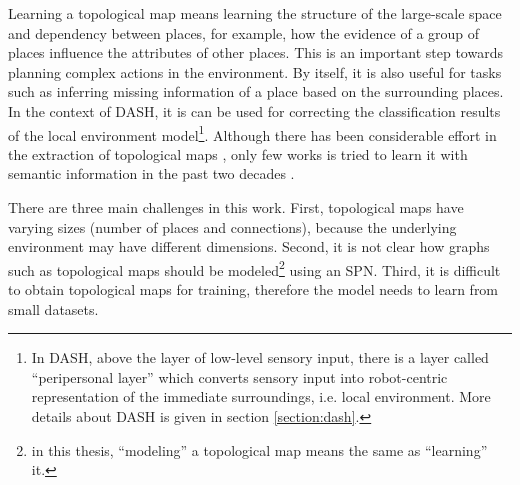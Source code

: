 \documentclass[10pt, titlepage]{article}
\theoremstyle{definition}
\begin{document}
Learning a topological map means learning the structure of the large-scale space and dependency between places, for example, how the evidence of a group of places influence the attributes of other places. This is an important step towards planning complex actions in the environment. By itself, it is also useful for tasks such as inferring missing information of a place based on the surrounding places. In the context of DASH, it is can be used for correcting the classification results of the local environment model\footnote{In DASH, above the layer of low-level sensory input, there is a layer called ``peripersonal layer'' which converts sensory input into robot-centric representation of the immediate surroundings, i.e. local environment. More details about DASH is given in section \ref{section:dash}.}. Although there has been considerable effort in the extraction of topological maps \cite{friedman2007voronoi}\cite{ranganathan2011online}\cite{shi2010online}\cite{tomatis2003hybrid}, only few works is tried to learn it with semantic information in the past two decades \cite{aydemir2012can}\cite{friedman2007voronoi}\cite{mozos2006supervised}.


There are three main challenges in this work. First, topological maps have varying sizes (number of places and connections), because the underlying environment may have different dimensions. Second, it is not clear how graphs such as topological maps should be modeled\footnote{in this thesis, ``modeling'' a topological map means the same as ``learning'' it.} using an SPN. Third, it is difficult to obtain topological maps for training, therefore the model needs to learn from small datasets.

\end{document}
